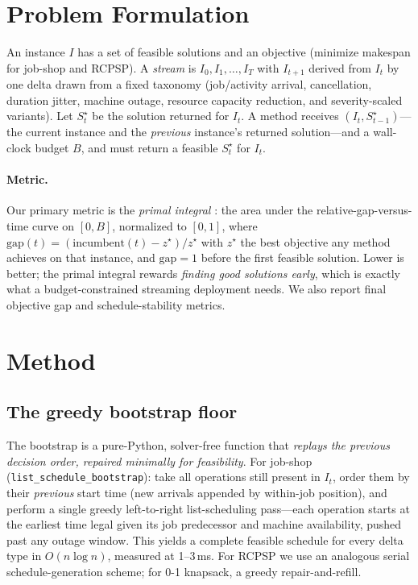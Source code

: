 \documentclass[11pt]{article}                        %
\begin{document}
\section{Problem Formulation}
\label{sec:problem}

An instance $I$ has a set of feasible solutions and an objective (minimize
makespan for job-shop and RCPSP). A \emph{stream} is $I_0, I_1, \dots, I_T$
with $I_{t+1}$ derived from $I_t$ by one delta drawn from a fixed taxonomy
(job/activity arrival, cancellation, duration jitter, machine outage, resource
capacity reduction, and severity-scaled variants). Let $S_t^\star$ be the
solution returned for $I_t$. A method receives $(I_t, S_{t-1}^\star)$---the
current instance and the \emph{previous} instance's returned solution---and a
wall-clock budget $B$, and must return a feasible $S_t^\star$ for $I_t$.

\paragraph{Metric.}
Our primary metric is the \emph{primal integral} \cite{berthold2013}: the area
under the relative-gap-versus-time curve on $[0,B]$, normalized to $[0,1]$,
where $\mathrm{gap}(t) = (\mathrm{incumbent}(t) - z^\star)/z^\star$ with
$z^\star$ the best objective any method achieves on that instance, and
$\mathrm{gap}=1$ before the first feasible solution. Lower is better; the
primal integral rewards \emph{finding good solutions early}, which is exactly
what a budget-constrained streaming deployment needs. We also report final
objective gap and schedule-stability metrics.

\section{Method}
\label{sec:method}

\subsection{The greedy bootstrap floor}
The bootstrap is a pure-Python, solver-free function that \emph{replays the
previous decision order, repaired minimally for feasibility}. For job-shop
(\texttt{list\_schedule\_bootstrap}): take all operations still present in
$I_t$, order them by their \emph{previous} start time (new arrivals appended by
within-job position), and perform a single greedy left-to-right list-scheduling
pass---each operation starts at the earliest time legal given its job
predecessor and machine availability, pushed past any outage window. This
yields a complete feasible schedule for every delta type in $O(n\log n)$,
measured at 1--3\,ms. For RCPSP we use an analogous serial schedule-generation
scheme; for 0-1 knapsack, a greedy repair-and-refill.
\end{document}
